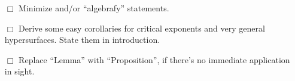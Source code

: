 \documentclass[11pt]{amsart}
\begin{document}
{\begin{enumerate}
 \item[$\Box$] Minimize and/or ``algebrafy'' statements.
 \item[$\Box$] Derive some easy corollaries for critical exponents and very general hypersurfaces.  State them in introduction. 
 \item[$\Box$] Replace ``Lemma'' with ``Proposition'', if there's no immediate application in sight.
 

\end{enumerate}}
\end{document}
